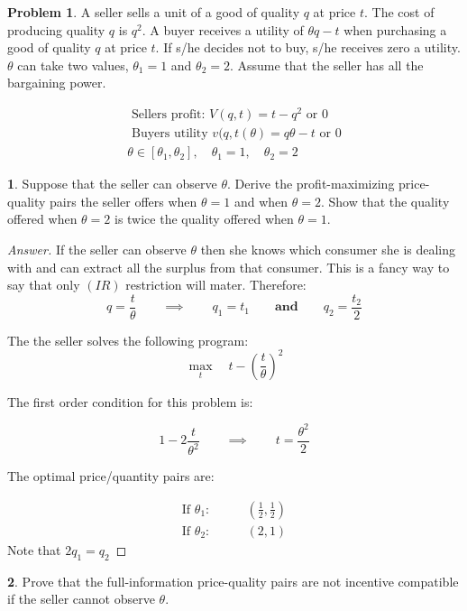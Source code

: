 \documentclass[12pt]{article}
\theoremstyle{definition}
\newtheorem{problem}{Problem}
\newtheorem{subproblem}{}[problem]
\newcommand{\qiq}{\qquad \implies \qquad}
\newcommand{\qaq}{\qquad \textbf{and} \qquad}
\begin{document}
\begin{problem}
A seller sells a unit of a good of quality $q$ at price $t$. The cost of producing quality $q$ is $q^{2}$. A buyer receives a utility of $\theta q-t$ when purchasing a good of quality $q$ at price $t$. If s/he decides not to buy, s/he receives zero a utility. $\theta$ can take two values, $\theta_{1}=1$ and $\theta_{2}=2$. Assume that the seller has all the bargaining power.
\end{problem}
$$
\begin{array}{l}
\text { Sellers profit: } V(q, t)=t-q^{2} \text { or } 0 \\
\text { Buyers utility } v(q, t(\theta)=q \theta-t \text { or } 0 \\
\left.\theta \in \left[ \theta_{1}, \theta_{2}\right], \quad \theta_{1}=1, \quad \theta_{2}=2
\end{array}
$$
\begin{subproblem}
Suppose that the seller can observe $\theta$. Derive the profit-maximizing price-quality pairs the seller offers when $\theta=1$ and when $\theta=2$. Show that the quality offered when $\theta=2$ is twice the quality offered when $\theta=1$.
\end{subproblem}
\begin{proof}[Answer]
If the seller can observe $\theta$ then she knows which consumer she is dealing with and can extract all the surplus from that consumer. This is a fancy way to say that only $(IR)$ restriction will mater. Therefore:
$$
q=\frac{t}{\theta} \qiq q_{1}=t_{1} \qaq q_{2}=\frac{t_{2}}{2}
$$

The the seller solves the following program:
$$\max_{t}\quad t-\left(\frac{t}{\theta}\right)^{2}$$

The first order condition for this problem is:

$$
1-2\frac{t}{\theta^2} \qiq \boxed{t = \frac{\theta^2}{2}}
$$

The optimal price/quantity pairs are:

\begin{align*}
    \text{If } \theta_1: &\qquad \left( \frac{1}{2}, \frac{1}{2}\right)\\ 
    \text{If } \theta_2: &\qquad \left(2,1\right)
\end{align*}
Note that $\boxed{2q_1 = q_2}$
\end{proof}
\begin{subproblem}
Prove that the full-information price-quality pairs are not incentive compatible if the seller cannot observe $\theta$.
\end{subproblem}
\end{document}

